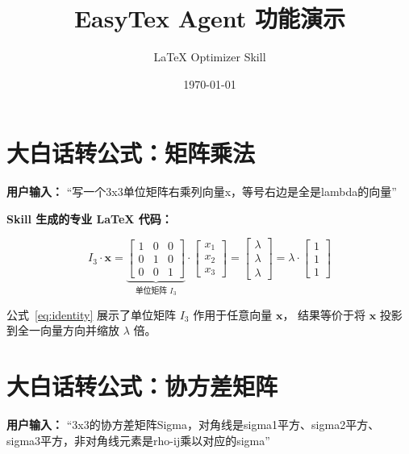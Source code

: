 \documentclass[12pt,a4paper]{ctexart}
\title{\bfseries EasyTex Agent 功能演示}
\author{LaTeX Optimizer Skill}
\date{\today}
\begin{document}
\maketitle
\tableofcontents
\newpage

\section{大白话转公式：矩阵乘法}

\textbf{用户输入：} ``写一个3x3单位矩阵右乘列向量x，等号右边是全是lambda的向量''

\textbf{Skill 生成的专业 LaTeX 代码：}

\begin{equation}
    I_3 \cdot \mathbf{x} =
    \underbrace{
        \begin{bmatrix}
            1 & 0 & 0 \\
            0 & 1 & 0 \\
            0 & 0 & 1
        \end{bmatrix}
    }_{\text{单位矩阵 } I_3}
    \cdot
    \begin{bmatrix}
        x_1 \\[2pt] x_2 \\[2pt] x_3
    \end{bmatrix}
    =
    \begin{bmatrix}
        \lambda \\[2pt] \lambda \\[2pt] \lambda
    \end{bmatrix}
    = \lambda \cdot
    \begin{bmatrix}
        1 \\[2pt] 1 \\[2pt] 1
    \end{bmatrix}
    \label{eq:identity}
\end{equation}

公式~\eqref{eq:identity} 展示了单位矩阵 $I_3$ 作用于任意向量 $\mathbf{x}$，
结果等价于将 $\mathbf{x}$ 投影到全一向量方向并缩放 $\lambda$ 倍。

\section{大白话转公式：协方差矩阵}

\textbf{用户输入：} ``3x3的协方差矩阵Sigma，对角线是sigma1平方、sigma2平方、sigma3平方，非对角线元素是rho-ij乘以对应的sigma''
\end{document}
